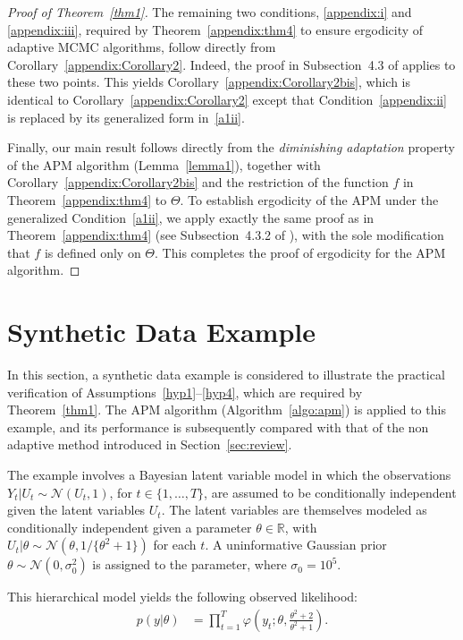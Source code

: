 \documentclass[pdflatex,sn-mathphys-num]{sn-jnl}
\theoremstyle{thmstyleone}
\theoremstyle{thmstyletwo}
\theoremstyle{thmstylethree}
\begin{document}
\begin{proof}[Proof of Theorem~{\upshape\ref{thm1}}]
The remaining two conditions, \eqref{appendix:i} and \eqref{appendix:iii}, required by Theorem~\ref{appendix:thm4} to ensure ergodicity of adaptive MCMC algorithms, follow directly from Corollary~\ref{appendix:Corollary2}. Indeed, the proof in Subsection~4.3 of \cite{atchade_limit_2010} applies to these two points. This yields Corollary~\ref{appendix:Corollary2bis}, which is identical to Corollary~\ref{appendix:Corollary2} except that Condition~\eqref{appendix:ii} is replaced by its generalized form in~\eqref{a1ii}.

Finally, our main result follows directly from the \textit{diminishing adaptation} property of the APM algorithm (Lemma~\ref{lemma1}), together with Corollary~\ref{appendix:Corollary2bis} and the restriction of the function $f$ in Theorem~\ref{appendix:thm4} to $\Theta$. To establish ergodicity of the APM under the generalized Condition~\eqref{a1ii}, we apply exactly the same proof as in Theorem~\ref{appendix:thm4} (see Subsection~4.3.2 of \cite{atchade_limit_2010}), with the sole modification that $f$ is defined only on $\Theta$. This completes the proof of ergodicity for the APM algorithm.
\end{proof}

\section{Synthetic Data Example}
\label{sec:syntheticex}
In this section, a synthetic data example is considered to illustrate the practical verification of Assumptions~\ref{hyp1}--\ref{hyp4}, which are required by Theorem~\ref{thm1}. The APM algorithm (Algorithm~\ref{algo:apm}) is applied to this example, and its performance is subsequently compared with that of the non adaptive method introduced in Section~\ref{sec:review}.

The example involves a Bayesian latent variable model in which the observations \( Y_t |U_t \sim \mathcal{N}(U_t, 1) \), for \( t \in \{1, \ldots, T\} \), are assumed to be conditionally independent given the latent variables \( U_t \). The latent variables are themselves modeled as conditionally independent given a parameter \( \theta \in \mathbb{R} \), with \( U_t |\theta \sim \mathcal{N}\left(\theta, {1}/\{\theta^2 + 1\}\right) \) for each \( t \). A uninformative Gaussian prior \( \theta \sim \mathcal{N}(0, \sigma_0^2) \) is assigned to the parameter, where \( \sigma_0 = 10^5 \). 

This hierarchical model yields the following observed likelihood:
\begin{align*}
    p(y |\theta)
    &= \prod_{t=1}^{T} \varphi\left(y_t ; \theta, \tfrac{\theta^2 + 2}{\theta^2 + 1}\right).
\end{align*}
\end{document}
